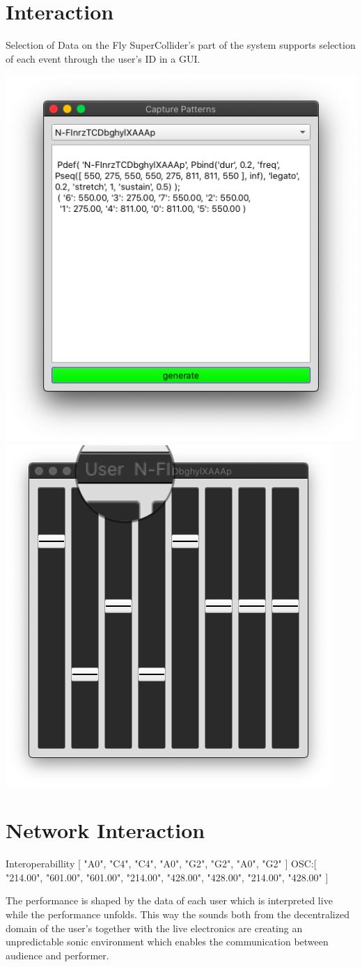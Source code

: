\documentclass[t, 10pt, seahorse, bigger]{beamer}
\begin{document}
\section{Interaction}
\label{sec:org740015a}
\begin{frame}[label={sec:orge6d185e}]{Selection of Data on the Fly}
SuperCollider's part of the system supports selection of each event through the user's ID in a GUI.
\begin{center}
\includegraphics[height=0.5\textwidth]{./screens/sc-pop-up.png}
\includegraphics[height=0.5\textwidth]{./screens/sc-sliders.png}
\end{center}
\end{frame}
\section{Network Interaction}
\label{sec:org12835ec}
\begin{frame}[label={sec:org7881014}]{Interoperabillity}
[ "A0", "C4", "C4", "A0", "G2", "G2", "A0", "G2" ]
OSC:[ "214.00", "601.00", "601.00", "214.00", "428.00", "428.00", "214.00", "428.00" ]

The performance is shaped by the data of each user which is interpreted live while the performance unfolds. This way the sounds both from the decentralized domain of the user's together with the live electronics are creating an unpredictable sonic environment which enables the communication between audience and performer.
\end{frame}
\end{document}
